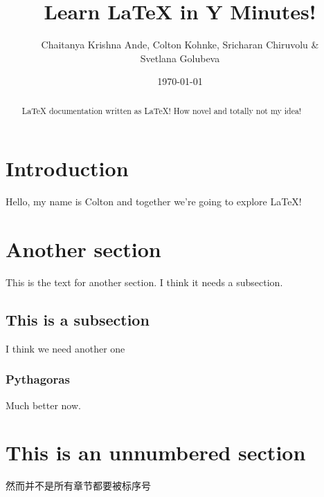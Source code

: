\documentclass[12pt,UTF8]{article}
\author{Chaitanya Krishna Ande, Colton Kohnke, Sricharan Chiruvolu \& \\
Svetlana Golubeva}
\date{\today}
\title{Learn \LaTeX \hspace{1pt} in Y Minutes!}
\begin{document}
 
\maketitle

\newpage
\tableofcontents

\newpage

\begin{abstract}
 \LaTeX \hspace{1pt} documentation written as \LaTeX! How novel and totally not
my idea!
\end{abstract}

\section{Introduction}
Hello, my name is Colton and together we're going to explore \LaTeX!

\section{Another section}
This is the text for another section. I think it needs a subsection.

\subsection{This is a subsection} %
I think we need another one

\subsubsection{Pythagoras}
Much better now.
\label{subsec:pythagoras}

\section*{This is an unnumbered section} 
然而并不是所有章节都要被标序号
\end{document}
